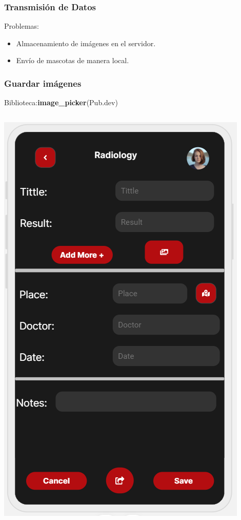 \documentclass[14pt]{beamer}
\begin{document}
\begin{frame}
\frametitle{Transmisión de Datos}
Problemas:
\begin{itemize}
\item Almacenamiento de imágenes en el servidor.
\item Envío de mascotas de manera local.
\end{itemize}


\end{frame}
\begin{frame}
\frametitle{Guardar imágenes}
Biblioteca:\textbf{image\_picker}(Pub.dev)
\begin{columns}
\begin{column}{0.5\textwidth}
\begin{center}

\includegraphics[scale = 0.32]{Images/photoExample.png}


\end{center}
\end{column}
\end{columns}
\end{frame}
\end{document}
